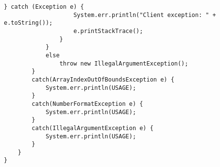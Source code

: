\begin{lstlisting}[style=java]
                } catch (Exception e) {
                    System.err.println("Client exception: " + e.toString());
                    e.printStackTrace();
                }
            }
            else
                throw new IllegalArgumentException();
        }
        catch(ArrayIndexOutOfBoundsException e) {
            System.err.println(USAGE);
        }
        catch(NumberFormatException e) {
            System.err.println(USAGE);
        }
        catch(IllegalArgumentException e) {
            System.err.println(USAGE);
        }
    }
}
\end{lstlisting}


